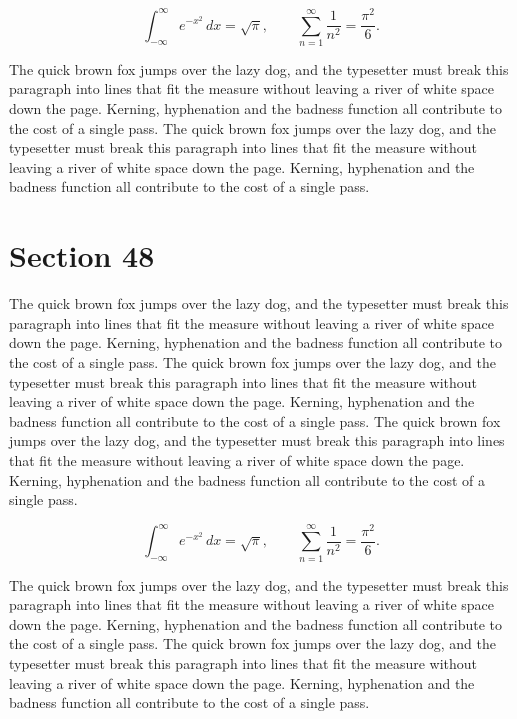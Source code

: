 \documentclass{article}
\begin{document}
\begin{equation}
\int_{-\infty}^{\infty} e^{-x^{2}}\,dx = \sqrt{\pi}, \qquad
\sum_{n=1}^{\infty} \frac{1}{n^{2}} = \frac{\pi^{2}}{6}.
\end{equation}

The quick brown fox jumps over the lazy dog, and the typesetter must break this paragraph into lines that fit the measure without leaving a river of white space down the page. Kerning, hyphenation and the badness function all contribute to the cost of a single pass. The quick brown fox jumps over the lazy dog, and the typesetter must break this paragraph into lines that fit the measure without leaving a river of white space down the page. Kerning, hyphenation and the badness function all contribute to the cost of a single pass. 
\section{Section 48}
The quick brown fox jumps over the lazy dog, and the typesetter must break this paragraph into lines that fit the measure without leaving a river of white space down the page. Kerning, hyphenation and the badness function all contribute to the cost of a single pass. The quick brown fox jumps over the lazy dog, and the typesetter must break this paragraph into lines that fit the measure without leaving a river of white space down the page. Kerning, hyphenation and the badness function all contribute to the cost of a single pass. The quick brown fox jumps over the lazy dog, and the typesetter must break this paragraph into lines that fit the measure without leaving a river of white space down the page. Kerning, hyphenation and the badness function all contribute to the cost of a single pass. 

\begin{equation}
\int_{-\infty}^{\infty} e^{-x^{2}}\,dx = \sqrt{\pi}, \qquad
\sum_{n=1}^{\infty} \frac{1}{n^{2}} = \frac{\pi^{2}}{6}.
\end{equation}

The quick brown fox jumps over the lazy dog, and the typesetter must break this paragraph into lines that fit the measure without leaving a river of white space down the page. Kerning, hyphenation and the badness function all contribute to the cost of a single pass. The quick brown fox jumps over the lazy dog, and the typesetter must break this paragraph into lines that fit the measure without leaving a river of white space down the page. Kerning, hyphenation and the badness function all contribute to the cost of a single pass. 
\end{document}
